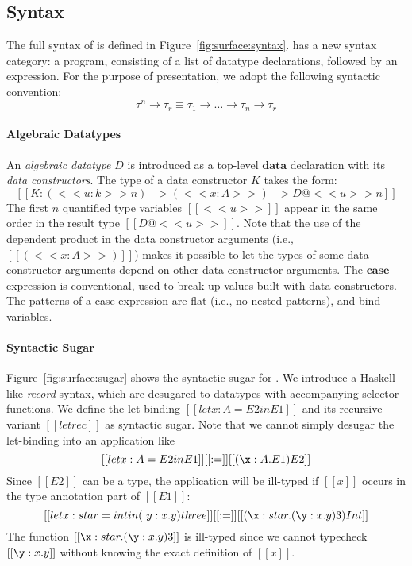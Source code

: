 \subsection{Syntax}

The full syntax of \sufcc is defined in
Figure~\ref{fig:surface:syntax}. \sufcc has a new
syntax category: a program, consisting of a list of datatype
declarations, followed by an expression. For the purpose of
presentation, we adopt the following syntactic convention:
\[
\overline{\tau}^n \rightarrow \tau_r \equiv \tau_1 \rightarrow \dots \rightarrow \tau_n \rightarrow \tau_r
\]

\paragraph{Algebraic Datatypes}
An \emph{algebraic datatype} $D$ is introduced as a top-level
$\mathbf{data}$ declaration with its \emph{data constructors}. The type
of a data constructor $K$ takes the form:
\[
[[K : (<<u:k>>n) -> (<<x : A>>) -> D@<<u>>n]]
\]
The first $n$ quantified type variables $[[<<u>>]]$ appear in the same
order in the result type $[[D@<<u>>]]$.  Note that the use of the
dependent product in the data constructor arguments (i.e.,
$[[(<<x:A>>)]]$) makes it possible to let the types of some data
constructor arguments depend on other data constructor arguments.
The $\mathbf{case}$ expression is conventional, used to break up values
built with data constructors.  The patterns of a case expression are
flat (i.e., no nested patterns), and bind variables.

\paragraph{Syntactic Sugar}
Figure~\ref{fig:surface:sugar} shows the syntactic sugar for \sufcc.
We introduce a Haskell-like \emph{record} syntax, which are desugared
to datatypes with accompanying selector functions.
We define the let-binding $[[let x:A=E2 in E1]]$ and its recursive
variant $[[letrec]]$ as syntactic sugar.
Note that we cannot simply desugar the let-binding into an application like
\[
[[let x:A=E2 in E1]] [[:=]] [[(\x:A.E1)E2]]
\]
Since $[[E2]]$ can be a type, the application will be ill-typed if
$[[x]]$ occurs in the type annotation part of $[[E1]]$:
\[
[[let x : star= int in (\ y : x . y) three]] [[:=]] [[(\x:star.(\y:x.y)
3) Int]]
\]
The function $[[\x:star.(\y:x.y) 3]]$ is ill-typed since we cannot
typecheck $[[\y:x.y]]$ without knowing the exact definition of $[[x]]$.

